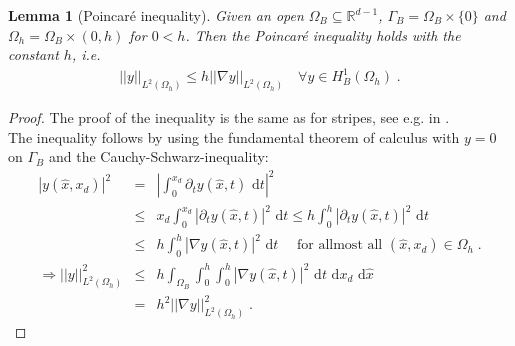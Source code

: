 \documentclass[a4paper,11pt]{article}
\newtheorem{lemma}[theorem]{Lemma}
\theoremstyle{remark}
\newcommand{\R}{\mathbb{R}}
\begin{document}
\begin{lemma}[Poincar\'e inequality]  \label{PoinIE}
Given an open 
    $\Omega_B \subseteq \R^{d-1}$,
$ \Gamma_B=\Omega_B\times \{ 0 \}$ and
$\Omega_h=\Omega_B\times (0,h)$  for $0<h$. 
Then the  Poincar\'e inequality holds with the constant $h$, i.e. 
\begin{eqnarray} \label{eq:PoinIE}
 || y||_{L^2(\Omega_h)}
  \leq h
  || \nabla y||_{L^2(\Omega_h)}
\quad \forall y \in H^1_B(\Omega_h) \; .
\end{eqnarray}
%
\end{lemma}
\begin{proof}
The proof of the inequality is the same as for stripes, see e.g. in \cite{Alt2016}.\\
The inequality follows by using the fundamental theorem of calculus with $y=0$ on $\Gamma_B$ and the Cauchy-Schwarz-inequality: 
\begin{eqnarray*}
  | y(\hat x, x_d) |^2 &=&
  |\int_0^{x_d}   \partial_t y(\hat x, t) \text{ d}t|^2
  \\
  &\leq &x_d \int_0^{x_d}   | \partial_t y(\hat x, t) |^2 \text{ d}t
  \leq h \int_0^h   | \partial_t y(\hat x, t) |^2 \text{ d}t\\
  &\leq& h \int_0^h  | \nabla y(\hat x, t) |^2 \text{ d}t
  \quad \mbox{ for allmost all } (\hat x, x_d) \in \Omega_h \; .
  \\
  \Rightarrow
  || y||_{L^2(\Omega_h)}^2&\leq&
                                 h \int_{\Omega_B}  \int_0^h   \int_0^h  | \nabla y(\hat x, t) |^2 \text{ d}t   \text{ d}x_d \text{ d}\hat x \\
&=&h^2 || \nabla y ||_{L^2(\Omega_h)}^2 \; .
\end{eqnarray*}
\end{proof}
\end{document}
